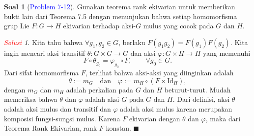 \documentclass[11pt]{article}
\theoremstyle{definition}
\newtheorem*{problem}{Soal}
\theoremstyle{remark}
\newtheorem*{solution}{\textcolor{red}{Solusi}}
\begin{document}
\begin{problem}[\textcolor{blue}{Problem 7-12}] Gunakan teorema rank ekivarian untuk memberikan bukti lain dari Teorema 7.5 dengan menunjukan bahwa setiap homomorfisma grup Lie $F : G \to H$ ekivarian terhadap aksi-$G$ mulus yang cocok pada $G$ dan $H$.
\end{problem}
\begin{solution}
Kita tahu bahwa $\forall g_1,g_2 \in G$, berlaku $F(g_1 g_2) = F(g_1)F(g_2)$. Kita ingin mencari aksi transitif $\theta : G \times G \to G$ dan aksi $\varphi : G \times H \to H$ yang memenuhi 
$$
F \circ \theta_{g_0} = \varphi_{g_0} \circ F, \qquad \forall g_0 \in G. 
$$
Dari sifat homomorfisma $F$, terlihat bahwa aksi-aksi yang diinginkan adalah
$$
\theta:=m_G \quad \text{dan} \quad \varphi:=m_H \circ (F \times \text{Id}_H),
$$
dengan $m_G$ dan $m_H$ adalah perkalian pada $G$ dan $H$ beturut-turut. Mudah memeriksa bahwa $\theta$ dan $\varphi$ adalah aksi-$G$ pada $G$ dan $H$. Dari definisi, aksi $\theta$ adalah aksi mulus dan transitif dan $\varphi$ adalah aksi mulus karena merupakan komposisi fungsi-sungsi mulus. Karena $F$ ekivarian dengan $\theta$ dan $\varphi$, maka dari Teorema Rank Ekivarian, rank $F$ konstan. $\blacksquare$
\end{solution}
\end{document}
